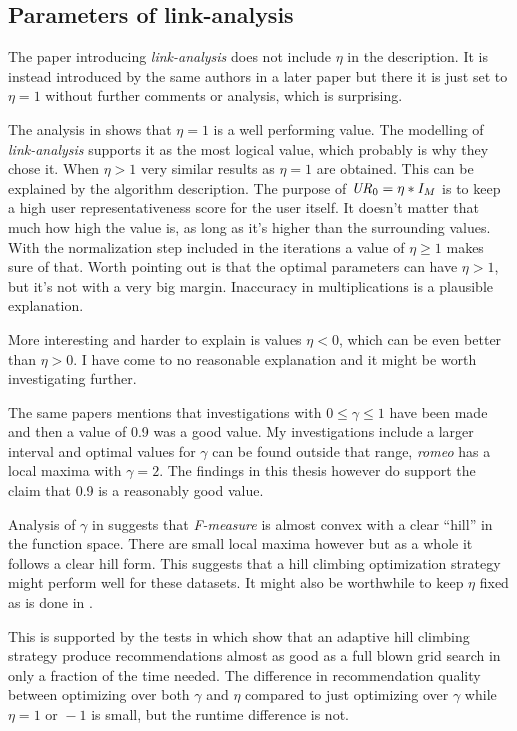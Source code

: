 \subsection{Parameters of link-analysis}

The paper introducing \textit{link-analysis} \cite{huang2004link} does not include $\eta$ in the description. It is instead introduced by the same authors in a later paper \cite{huang2007comparison} but there it is just set to $\eta = 1$ without further comments or analysis, which is surprising.

The analysis in  shows that $\eta = 1$ is a well performing value. The modelling of \textit{link-analysis} supports it as the most logical value, which probably is why they chose it. When $\eta > 1$ very similar results as $\eta = 1$ are obtained. This can be explained by the algorithm description. The purpose of $\mathit{UR}_0 = \eta * I_M$ is to keep a high user representativeness score for the user itself. It doesn't matter that much how high the value is, as long as it's higher than the surrounding values. With the normalization step included in the iterations a value of $\eta \geq 1$ makes sure of that. Worth pointing out is that the optimal parameters can have $\eta > 1$, but it's not with a very big margin. Inaccuracy in multiplications is a plausible explanation.

More interesting and harder to explain is values $\eta < 0$, which can be even better than $\eta > 0$. I have come to no reasonable explanation and it might be worth investigating further.

The same papers \cite{huang2004link, huang2007comparison} mentions that investigations with $0 \leq \gamma \leq 1$ have been made and then a value of 0.9 was a good value. My investigations include a larger interval and optimal values for $\gamma$ can be found outside that range, \textit{romeo} has a local maxima with $\gamma = 2$. The findings in this thesis however do support the claim that 0.9 is a reasonably good value.

Analysis of $\gamma$ in  suggests that \textit{F-measure} is almost convex with a clear ``hill'' in the function space. There are small local maxima however but as a whole it follows a clear hill form. This suggests that a hill climbing optimization strategy might perform well for these datasets. It might also be worthwhile to keep $\eta$ fixed as is done in \cite{huang2004link, huang2007comparison}.

This is supported by the tests in  which show that an adaptive hill climbing strategy produce recommendations almost as good as a full blown grid search in only a fraction of the time needed. The difference in recommendation quality between optimizing over both $\gamma$ and $\eta$ compared to just optimizing over $\gamma$ while $\eta = 1 \text{ or } -1$ is small, but the runtime difference is not.

